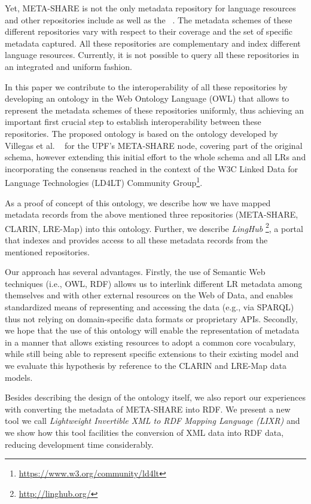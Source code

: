 \documentclass{llncs}
\begin{document}
Yet, META-SHARE is not the only metadata repository for language resources and other repositories include \cite[CLARIN]{broeder2010data} as well as the 
~\cite[LRE-Map]{calzolari2012lre}. The metadata schemes of these different repositories vary with respect to their coverage and the set of specific metadata captured. 
All these repositories are complementary and index different language resources. Currently, it is not possible to query all these repositories in an integrated and uniform fashion. 

In this paper we contribute to the interoperability of all these repositories by developing an ontology in the Web Ontology Language (OWL) that allows to represent the metadata schemes of these repositories uniformly, thus achieving an important first crucial step to establish interoperability between these repositories. The proposed ontology is based on the ontology developed by Villegas et al. ~\cite{Villegas2014} for the UPF's META-SHARE node, covering part of the original schema, however extending this initial effort to the whole schema and all LRs and incorporating the consensus 
reached in the context of the W3C Linked Data for Language Technologies (LD4LT) Community Group\footnote{\url{https://www.w3.org/community/ld4lt}}.

As a proof of concept of this ontology, we describe how we have mapped metadata records from the above mentioned three repositories (META-SHARE, CLARIN, LRE-Map) into this ontology. Further, we describe \emph{LingHub} \footnote{\url{http://linghub.org/}}, a portal that indexes and provides access to all these metadata records from the mentioned repositories. 

Our approach has several advantages. Firstly, the use of Semantic Web techniques
(i.e., OWL, RDF) allows us to
interlink different LR metadata among themselves and with other external resources on the Web of Data, and enables standardized means of representing and accessing the data (e.g., via SPARQL) thus not relying on domain-specific data formats or proprietary APIs. Secondly, we hope that the use of this ontology will enable the representation of metadata in a manner that allows existing resources to adopt a
common core vocabulary, while still being able to represent specific extensions
to their existing model and we evaluate this hypothesis by reference to the
CLARIN and LRE-Map data models.

Besides describing the design of the ontology itself, we also report our experiences with converting the metadata of META-SHARE into RDF.
We present a new tool we call \emph{Lightweight Invertible XML to RDF Mapping
Language (LIXR)} and we show how this tool facilities the conversion of XML data into RDF data, reducing development time considerably.
\end{document}
